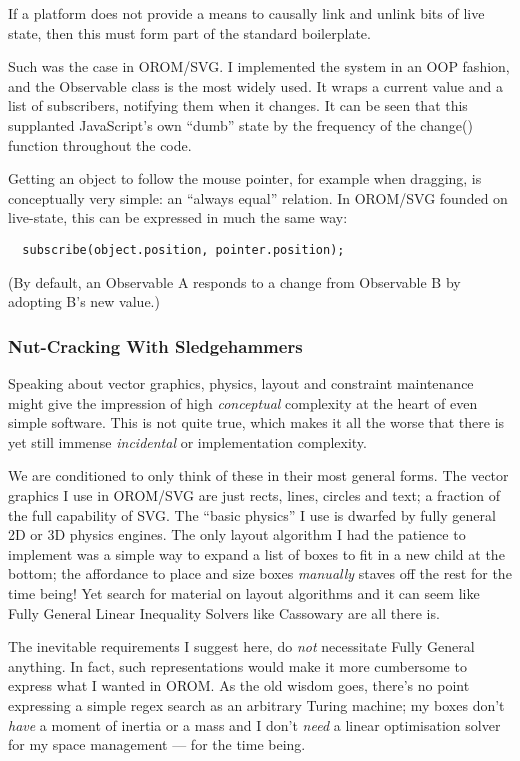 \documentclass[english,submission]{programming}
\begin{document}
  If a platform does not provide a means to causally link and unlink bits
  of live state, then this must form part of the standard boilerplate.

  Such was the case in OROM/SVG. I implemented the system in an OOP
  fashion, and the Observable class is the most widely used. It wraps a
  current value and a list of subscribers, notifying them when it changes.
  It can be seen that this supplanted JavaScript's own ``dumb'' state by
  the frequency of the change() function throughout the code.

  Getting an object to follow the mouse pointer, for example when
  dragging, is conceptually very simple: an ``always equal'' relation. In
  OROM/SVG founded on live-state, this can be expressed in much the same
  way:

  \begin{verbatim}
  subscribe(object.position, pointer.position);
  \end{verbatim}

  (By default, an Observable A responds to a change from Observable B by
  adopting B's new value.)

  \hypertarget{nut-cracking-with-sledgehammers}{%
  \subsubsection{Nut-Cracking With
  Sledgehammers}\label{nut-cracking-with-sledgehammers}}

  Speaking about vector graphics, physics, layout and constraint
  maintenance might give the impression of high \emph{conceptual}
  complexity at the heart of even simple software. This is not quite true,
  which makes it all the worse that there is yet still immense
  \emph{incidental} or implementation complexity.

  We are conditioned to only think of these in their most general forms.
  The vector graphics I use in OROM/SVG are just rects, lines, circles and
  text; a fraction of the full capability of SVG. The ``basic physics'' I
  use is dwarfed by fully general 2D or 3D physics engines. The only
  layout algorithm I had the patience to implement was a simple way to
  expand a list of boxes to fit in a new child at the bottom; the
  affordance to place and size boxes \emph{manually} staves off the rest
  for the time being! Yet search for material on layout algorithms and it
  can seem like Fully General Linear Inequality Solvers like Cassowary are
  all there is.

  The inevitable requirements I suggest here, do \emph{not} necessitate
  Fully General anything. In fact, such representations would make it more
  cumbersome to express what I wanted in OROM. As the old wisdom goes,
  there's no point expressing a simple regex search as an arbitrary Turing
  machine; my boxes don't \emph{have} a moment of inertia or a mass and I
  don't \emph{need} a linear optimisation solver for my space management
  --- for the time being.
\end{document}
